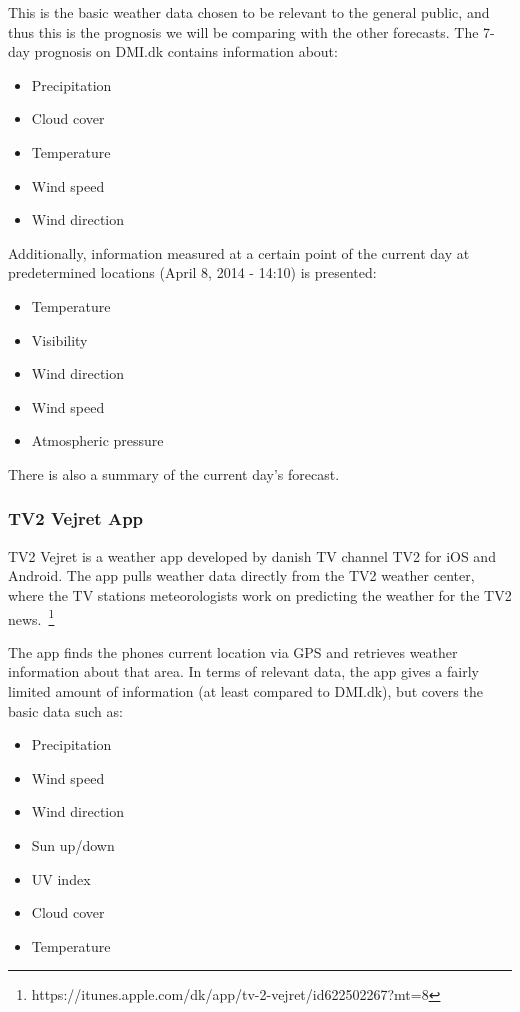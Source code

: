 This is the basic weather data chosen to be relevant to the general public, and thus this is the prognosis we will be comparing with the other forecasts. 
The 7-day prognosis on DMI.dk contains information about:

\begin{itemize}
    \item Precipitation
    \item Cloud cover
    \item Temperature
    \item Wind speed
    \item Wind direction
\end{itemize}

Additionally, information measured at a certain point of the current day at predetermined locations (April 8, 2014 - 14:10) is presented:

\begin{itemize}
    \item Temperature
    \item Visibility
    \item Wind direction
    \item Wind speed
    \item Atmospheric pressure
\end{itemize}

There is also a summary of the current day’s forecast.


\FloatBarrier
\subsubsection*{TV2 Vejret App} %
\label{ssub:tv2_vejret_app}

TV2 Vejret is a weather app developed by danish TV channel TV2 for iOS and Android. 
The app pulls weather data directly from the TV2 weather center, where the TV stations meteorologists work on predicting the weather for the TV2 news.~\footnote{https://itunes.apple.com/dk/app/tv-2-vejret/id622502267?mt=8}


The app finds the phones current location via GPS and retrieves weather information about that area. In terms of relevant data, the app gives a fairly limited amount of information (at least compared to DMI.dk), but covers the basic data such as:

\begin{itemize}
    \item Precipitation
    \item Wind speed
    \item Wind direction
    \item Sun up/down
    \item UV index
    \item Cloud cover
    \item Temperature
\end{itemize} 

